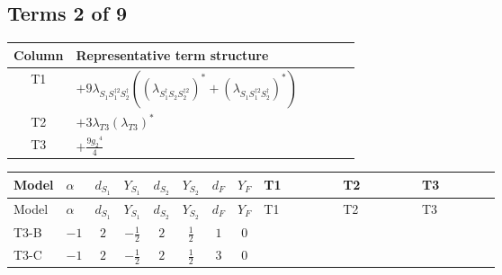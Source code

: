 \documentclass[8pt]{article}
\begin{document}
\begin{landscape}
\subsection*{Terms 2 of 9}
\begin{center}
\begin{tabular}{@{}c >{\raggedright\arraybackslash}p{0.82\linewidth}@{}}
\toprule
Column & Representative term structure \\
\midrule
T1 & \(\displaystyle +9 {\lambda_{S_1 S_1^{\dagger 2}S_2^\dagger}} (\left({\lambda_{S_1^\dagger S_2 S_2^{\dagger 2}}}\right)^{*}+\left({\lambda_{S_1 S_1^{\dagger 2}S_2^\dagger}}\right)^{*})\) \\
\midrule
T2 & \(\displaystyle +3 {\lambda_{T3}} \left({\lambda_{T3}}\right)^{*}\) \\
\midrule
T3 & \(\displaystyle +\frac{9 {g_2}^4}{4}\) \\
\midrule
\bottomrule
\end{tabular}
\end{center}
\smallskip
\tiny
\begin{longtable}{@{}llcccccc >{\raggedright\arraybackslash}p{0.21\linewidth} >{\raggedright\arraybackslash}p{0.21\linewidth} >{\raggedright\arraybackslash}p{0.21\linewidth}@{}}
\toprule
Model & $\alpha$ & $d_{S_1}$ & $Y_{S_1}$ & $d_{S_2}$ & $Y_{S_2}$ & $d_F$ & $Y_F$ & T1 & T2 & T3 \\
\midrule
\endfirsthead
\toprule
Model & $\alpha$ & $d_{S_1}$ & $Y_{S_1}$ & $d_{S_2}$ & $Y_{S_2}$ & $d_F$ & $Y_F$ & T1 & T2 & T3 \\
\midrule
\endhead
T3-B & $-1$ & $2$ & $-\frac{1}{2}$ & $2$ & $\frac{1}{2}$ & $1$ & $0$ & \scriptsize\adjustbox{max width=\linewidth}{$\begin{gathered} +9 {\lambda_{S_1 S_1^{\dagger 2}S_2^\dagger}} (\left({\lambda_{S_1^\dagger S_2 S_2^{\dagger 2}}}\right)^{*}+\left({\lambda_{S_1 S_1^{\dagger 2}S_2^\dagger}}\right)^{*})\end{gathered}$} & \scriptsize\adjustbox{max width=\linewidth}{$\begin{gathered} +3 {\lambda_{T3}} \left({\lambda_{T3}}\right)^{*}\end{gathered}$} & \scriptsize\adjustbox{max width=\linewidth}{$\begin{gathered} +\frac{9 {g_2}^4}{4}\end{gathered}$} \\
\midrule
T3-C & $-1$ & $2$ & $-\frac{1}{2}$ & $2$ & $\frac{1}{2}$ & $3$ & $0$ & \scriptsize\adjustbox{max width=\linewidth}{$\begin{gathered} +9 {\lambda_{S_1 S_1^{\dagger 2}S_2^\dagger}} (\left({\lambda_{S_1^\dagger S_2 S_2^{\dagger 2}}}\right)^{*}+\left({\lambda_{S_1 S_1^{\dagger 2}S_2^\dagger}}\right)^{*})\end{gathered}$} & \scriptsize\adjustbox{max width=\linewidth}{$\begin{gathered} +3 {\lambda_{T3}} \left({\lambda_{T3}}\right)^{*}\end{gathered}$} & \scriptsize\adjustbox{max width=\linewidth}{$\begin{gathered} +\frac{9 {g_2}^4}{4}\end{gathered}$} \\

\end{longtable}
\end{landscape}
\end{document}
